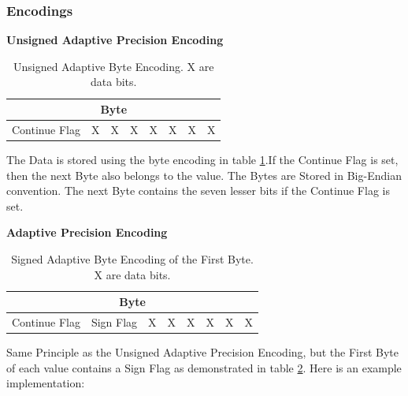 \subsubsection{Encodings} \label{anhang:format:encodings}
\textbf{Unsigned Adaptive Precision Encoding}\\
\begin{table}[!htbp]
	\center
	\begin{tabular}{|c|c|c|c||c|c|c|c|}
	\hline
	\multicolumn{8}{|c|}{Byte}\\\hline
	Continue Flag & X & X & X & X & X & X & X \\\hline
	\end{tabular}
	\caption{Unsigned Adaptive Byte Encoding. X are data bits.}
	\label{anhang:format:encodings:adaptiveUnsigned}
\end{table}
The Data is stored using the byte encoding in table \ref{anhang:format:encodings:adaptiveUnsigned}.If the Continue Flag is set, then the next Byte also belongs to the value. The Bytes are Stored in Big-Endian\cite{wiki:endianess} convention. The next Byte contains the seven lesser bits if the Continue Flag is set.

\textbf{Adaptive Precision Encoding}\\
\begin{table}[!htbp]
	\center
	\begin{tabular}{|c|c|c|c||c|c|c|c|}
	\hline
	\multicolumn{8}{|c|}{Byte}\\\hline
	Continue Flag & Sign Flag & X & X & X & X & X & X \\\hline
	\end{tabular}
	\caption{Signed Adaptive Byte Encoding of the First Byte.  X are data bits.}
	\label{anhang:format:encodings:adaptive}
\end{table}
Same Principle as the Unsigned Adaptive Precision Encoding, but the First Byte of each value contains a Sign Flag as demonstrated in table \ref{anhang:format:encodings:adaptive}. Here is an example implementation:\\


